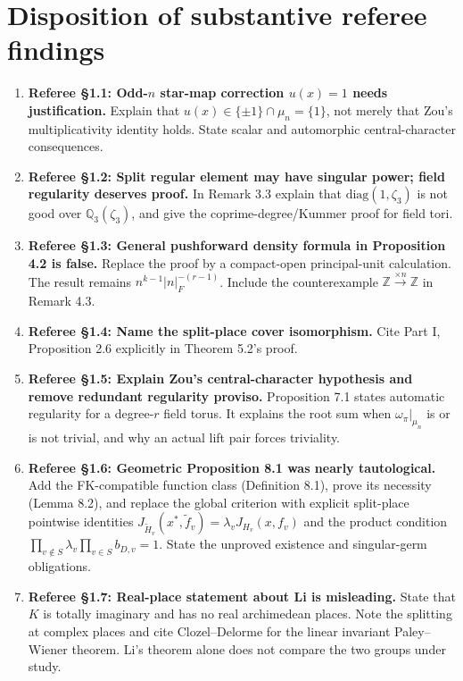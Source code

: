 \documentclass[11pt]{article}
\begin{document}
\section*{Disposition of substantive referee findings}
\begin{enumerate}[leftmargin=*,itemsep=0.55em]
\item \textbf{Referee \S1.1: Odd-$n$ star-map correction $u(x)=1$ needs justification.} Explain that $u(x)\in\{\pm1\}\cap\mu_n=\{1\}$, not merely that Zou's multiplicativity identity holds.  State scalar and automorphic central-character consequences.
\item \textbf{Referee \S1.2: Split regular element may have singular power; field regularity deserves proof.} In Remark 3.3 explain that $\mathrm{diag}(1,\zeta_3)$ is not good over $\mathbb Q_3(\zeta_3)$, and give the coprime-degree/Kummer proof for field tori.
\item \textbf{Referee \S1.3: General pushforward density formula in Proposition 4.2 is false.} Replace the proof by a compact-open principal-unit calculation. The result remains $n^{k-1}|n|_F^{-(r-1)}$. Include the counterexample $\mathbb Z\xrightarrow{\times n}\mathbb Z$ in Remark 4.3.
\item \textbf{Referee \S1.4: Name the split-place cover isomorphism.} Cite Part I, Proposition 2.6 explicitly in Theorem 5.2's proof.
\item \textbf{Referee \S1.5: Explain Zou's central-character hypothesis and remove redundant regularity proviso.} Proposition 7.1 states automatic regularity for a degree-$r$ field torus.  It explains the root sum when $\omega_\pi|_{\mu_n}$ is or is not trivial, and why an actual lift pair forces triviality.
\item \textbf{Referee \S1.6: Geometric Proposition 8.1 was nearly tautological.} Add the FK-compatible function class (Definition 8.1), prove its necessity (Lemma 8.2), and replace the global criterion with explicit split-place pointwise identities $J_{\widetilde H_v}(x^*,\widetilde f_v)=\lambda_v J_{H_v}(x,f_v)$ and the product condition $\prod_{v\notin S}\lambda_v\prod_{v\in S}b_{D,v}=1$.  State the unproved existence and singular-germ obligations.
\item \textbf{Referee \S1.7: Real-place statement about Li is misleading.} State that $K$ is totally imaginary and has no real archimedean places.  Note the splitting at complex places and cite Clozel--Delorme for the linear invariant Paley--Wiener theorem.  Li's theorem alone does not compare the two groups under study.

\end{enumerate}
\end{document}
